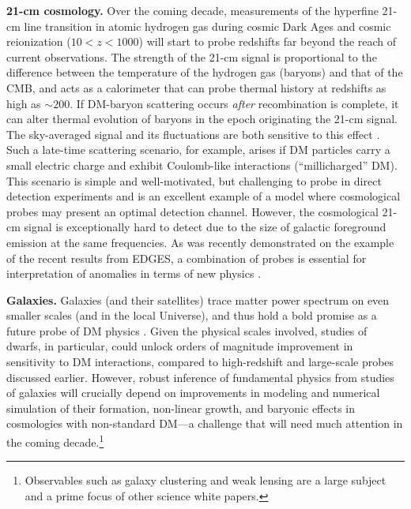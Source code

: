 \documentclass[12pt]{article}
\begin{document}
\textbf{21-cm cosmology.} 
Over the coming decade, measurements of the hyperfine 21-cm line transition in atomic hydrogen gas during cosmic Dark Ages and cosmic reionization ($10<z<1000$) will start to probe redshifts far beyond the reach of current observations.
The strength of the 21-cm signal is proportional to the difference between the temperature of the hydrogen gas (baryons) and that of the CMB, and acts as a calorimeter that can probe thermal history at redshifts as high as $\sim 200$.
If DM-baryon scattering occurs \textit{after} recombination is complete, it can alter thermal evolution of baryons in the epoch originating the 21-cm signal. 
The sky-averaged signal and its fluctuations are both sensitive to this effect \cite{Munoz_15, Barkana_18, Fialkov_18, Munoz_18}.
Such a late-time scattering scenario, for example, arises if DM particles carry a small electric charge and exhibit Coulomb-like interactions (``millicharged'' DM).
This scenario is simple and well-motivated, but challenging to probe in direct detection experiments and is an excellent example of a model where cosmological probes may present an optimal detection channel.
However, the cosmological 21-cm signal is exceptionally hard to detect due to the size of galactic foreground emission at the same frequencies. 
As was recently demonstrated on the example of the recent results from EDGES, a combination of probes is essential for interpretation of anomalies in terms of new physics \cite{Barkana:2018lgd,Kovetz:2018zan,Berlin:2018sjs}. 

\textbf{Galaxies.}
Galaxies (and their satellites) trace matter power spectrum on even smaller scales (and in the local Universe), and thus hold a bold promise as a future probe of DM physics \cite{2019arXiv190201055D}.
Given the physical scales involved, studies of dwarfs, in particular, could unlock orders of magnitude improvement in sensitivity to DM interactions, compared to high-redshift and large-scale probes discussed earlier.
However, robust inference of fundamental physics from studies of galaxies will crucially depend on improvements in modeling and numerical simulation of their formation, non-linear growth, and baryonic effects in cosmologies with non-standard DM---a challenge that will need much attention in the coming decade.\footnote{Observables such as galaxy clustering and weak lensing are a large subject and a prime focus of other science white papers.}

\end{document}
